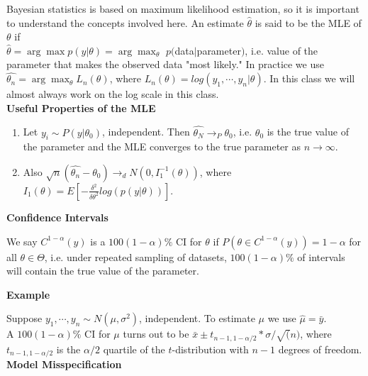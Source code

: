 \documentclass[12pt]{article}
\begin{document}
Bayesian statistics is based on maximum likelihood estimation, so it is important to understand the concepts involved here. An estimate $\hat{\theta}$ is said to be the MLE of $\theta$ if \\
$\hat{\theta}=\arg\max p(y|\theta)=\arg\max_\theta $ $p($data$|$parameter$)$, i.e. value of the parameter that makes the  observed data "most likely." In practice we use $\hat{\theta_n}=\arg\max_\theta L_n(\theta)$, where $L_n(\theta)=log(y_1,\cdots,y_n|\theta)$. In this class we will almost always work on the log scale in this class.\\

\textbf{Useful Properties of the MLE}
\begin{enumerate}
\item
Let $y_i \sim P(y|\theta_0)$, independent. Then $\hat{\theta_N} \rightarrow_P \theta_0$, i.e. $\theta_0$ is the true value of the parameter and the MLE converges to the true parameter as $n \rightarrow \infty$.\\
\item
Also $\sqrt{n}(\hat{\theta_n}-\theta_0) \rightarrow_d N(0,I_1^{-1}(\theta))$, where $I_1(\theta)=E[-\frac{\delta^2}{\delta \theta^2} log(p(y|\theta))]$.\\
\end{enumerate}

\textbf{Confidence Intervals}

We say $C^{1-\alpha}(y)$ is a $100(1-\alpha)\%$ CI for $\theta$ if $P(\theta \in C^{1-\alpha}(y))=1-\alpha$ for all $\theta \in \Theta$, i.e. under repeated sampling of datasets, $100(1-\alpha)\%$ of intervals will contain the true value of the parameter.

\textbf{Example}

Suppose $y_1,\cdots,y_n \sim N(\mu, \sigma^2)$, independent.
To estimate $\mu$ we use $\hat{\mu}=\bar{y}.$\\
A $100(1-\alpha)\%$ CI for $\mu$ turns out to be $\bar{x} \pm t_{n-1,1-\alpha/2}*\sigma/\sqrt(n)$, where $t_{n-1,1-\alpha/2}$ is the $\alpha/2$ quartile of the $t$-distribution with $n-1$ degrees of freedom.\\

\textbf{Model Misspecification}
\end{document}
